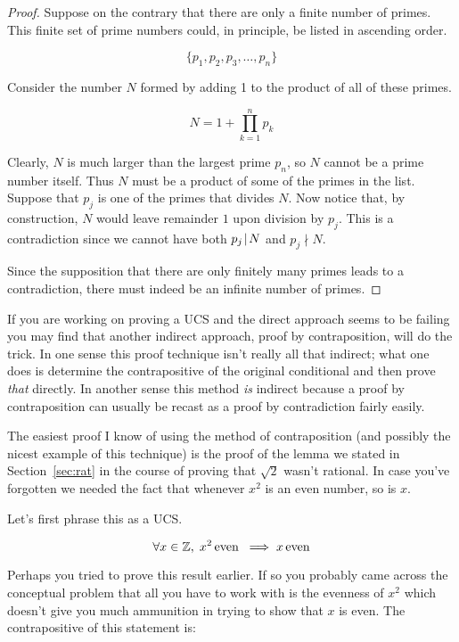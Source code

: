 \begin{proof}
Suppose on the contrary that there are only a finite number
of primes.  This finite set of prime numbers could, in principle, be listed
in ascending order.

\[  \{ p_1, p_2, p_3, \ldots , p_n \} \]

Consider the number $N$ formed by adding 1 to the product of all of these 
primes.

\[ N = 1 + \prod_{k=1}^n p_k \]

Clearly, $N$ is much larger than the largest prime $p_n$, so $N$ cannot
be a prime number itself.  Thus $N$ must be a product of some of the 
primes in the list.  Suppose that $p_j$ is one of the primes that 
divides $N$.  Now notice that, by construction, $N$ would leave remainder
$1$ upon division by $p_j$.  This is a contradiction since we cannot have
both $p_j \!\mid\! N$ and $p_j \nmid N$. 

Since the supposition that there are only finitely many primes leads to
a contradiction, there must indeed be an infinite number of primes.

\end{proof}

If you are working on proving a UCS and the direct approach seems to be
failing you may find that another indirect approach, 
proof by contraposition,
will do the trick.  In one sense this proof technique isn't really all that
indirect; what one does is determine the contrapositive of the original
conditional and then prove {\em that} directly.  In another sense this 
method {\em is} indirect because a proof by contraposition can usually
be recast as a proof by contradiction fairly easily.  

The easiest proof I know of using the method of contraposition (and possibly
the nicest example of this technique)
is the proof of the lemma we stated in Section~\ref{sec:rat} in the course
of proving that $\sqrt{2}$ wasn't rational.  In case you've forgotten
we needed the fact that whenever $x^2$ is an even number, so is $x$.

Let's first phrase this as a UCS.

\[ \forall x \in {\mathbb Z}, \; x^2 \, \mbox{even} \; \implies x \, \mbox{even} 
\]

Perhaps you tried to prove this result earlier.  If so you probably
came across the conceptual problem that all you have to work with
is the evenness of $x^2$ which doesn't give you much ammunition
in trying to show that $x$ is even.  The contrapositive of this 
statement is:

